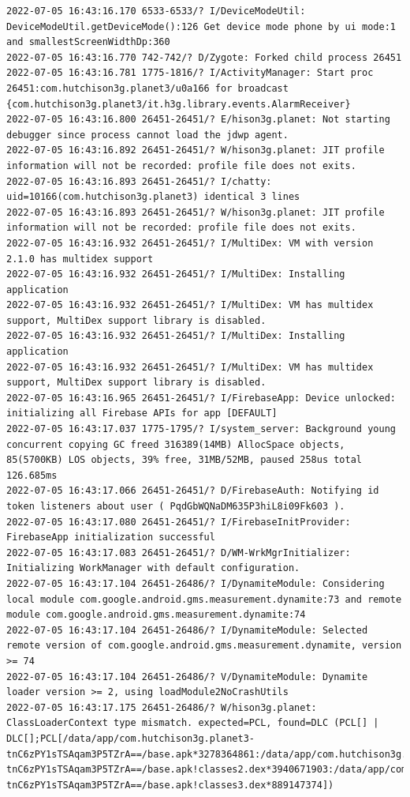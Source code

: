 \documentclass[a4paper,12pt]{book}
\begin{document}
\begin{lstlisting}
2022-07-05 16:43:16.170 6533-6533/? I/DeviceModeUtil: DeviceModeUtil.getDeviceMode():126 Get device mode phone by ui mode:1 and smallestScreenWidthDp:360
2022-07-05 16:43:16.770 742-742/? D/Zygote: Forked child process 26451
2022-07-05 16:43:16.781 1775-1816/? I/ActivityManager: Start proc 26451:com.hutchison3g.planet3/u0a166 for broadcast {com.hutchison3g.planet3/it.h3g.library.events.AlarmReceiver}
2022-07-05 16:43:16.800 26451-26451/? E/hison3g.planet: Not starting debugger since process cannot load the jdwp agent.
2022-07-05 16:43:16.892 26451-26451/? W/hison3g.planet: JIT profile information will not be recorded: profile file does not exits.
2022-07-05 16:43:16.893 26451-26451/? I/chatty: uid=10166(com.hutchison3g.planet3) identical 3 lines
2022-07-05 16:43:16.893 26451-26451/? W/hison3g.planet: JIT profile information will not be recorded: profile file does not exits.
2022-07-05 16:43:16.932 26451-26451/? I/MultiDex: VM with version 2.1.0 has multidex support
2022-07-05 16:43:16.932 26451-26451/? I/MultiDex: Installing application
2022-07-05 16:43:16.932 26451-26451/? I/MultiDex: VM has multidex support, MultiDex support library is disabled.
2022-07-05 16:43:16.932 26451-26451/? I/MultiDex: Installing application
2022-07-05 16:43:16.932 26451-26451/? I/MultiDex: VM has multidex support, MultiDex support library is disabled.
2022-07-05 16:43:16.965 26451-26451/? I/FirebaseApp: Device unlocked: initializing all Firebase APIs for app [DEFAULT]
2022-07-05 16:43:17.037 1775-1795/? I/system_server: Background young concurrent copying GC freed 316389(14MB) AllocSpace objects, 85(5700KB) LOS objects, 39% free, 31MB/52MB, paused 258us total 126.685ms
2022-07-05 16:43:17.066 26451-26451/? D/FirebaseAuth: Notifying id token listeners about user ( PqdGbWQNaDM635P3hiL8i09Fk603 ).
2022-07-05 16:43:17.080 26451-26451/? I/FirebaseInitProvider: FirebaseApp initialization successful
2022-07-05 16:43:17.083 26451-26451/? D/WM-WrkMgrInitializer: Initializing WorkManager with default configuration.
2022-07-05 16:43:17.104 26451-26486/? I/DynamiteModule: Considering local module com.google.android.gms.measurement.dynamite:73 and remote module com.google.android.gms.measurement.dynamite:74
2022-07-05 16:43:17.104 26451-26486/? I/DynamiteModule: Selected remote version of com.google.android.gms.measurement.dynamite, version >= 74
2022-07-05 16:43:17.104 26451-26486/? V/DynamiteModule: Dynamite loader version >= 2, using loadModule2NoCrashUtils
2022-07-05 16:43:17.175 26451-26486/? W/hison3g.planet: ClassLoaderContext type mismatch. expected=PCL, found=DLC (PCL[] | DLC[];PCL[/data/app/com.hutchison3g.planet3-tnC6zPY1sTSAqam3P5TZrA==/base.apk*3278364861:/data/app/com.hutchison3g.planet3-tnC6zPY1sTSAqam3P5TZrA==/base.apk!classes2.dex*3940671903:/data/app/com.hutchison3g.planet3-tnC6zPY1sTSAqam3P5TZrA==/base.apk!classes3.dex*889147374])

\end{lstlisting}
\end{document}
